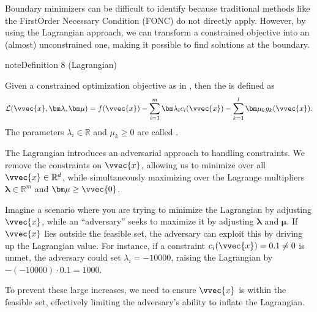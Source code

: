 \documentclass[letterpaper,10pt,english]{jupyterBook}
\begin{document}
\sphinxAtStartPar
Boundary minimizers can be difficult to identify because traditional methods like the First\sphinxhyphen{}Order Necessary Condition (FONC) do not directly apply. However, by using the Lagrangian approach, we can transform a constrained objective into an (almost) unconstrained one, making it possible to find solutions at the boundary.
\label{optimization_problems:lagrangian}
\begin{sphinxadmonition}{note}{Definition 8 (Lagrangian)}



\sphinxAtStartPar
Given a constrained optimization objective as in {\hyperref[\detokenize{optimization_problems:constr_objective}]{}}, then  the  is defined as
\begin{equation*}
\begin{split}\mathcal{L}(\vvec{x},\bm\lambda,\bm\mu) = f(\vvec{x}) - \sum_{i=1}^m\bm\lambda_i c_i(\vvec{x}) - \sum_{k=1}^l\bm\mu_k g_k(\vvec{x}).\end{split}
\end{equation*}
The parameters \(\lambda_i\in\mathbb{R}\) and \(\mu_k\geq 0\) are called .
\end{sphinxadmonition}

\sphinxAtStartPar
The Lagrangian introduces an adversarial approach to handling constraints. We remove the constraints on \(\vvec{x}\), allowing us to minimize over all \(\vvec{x}\in\mathbb{R}^d\), while simultaneously maximizing over the Lagrange multipliers \(\bm\lambda\in\mathbb{R}^m\) and \(\bm\mu\geq\vvec{0}\).

\sphinxAtStartPar
Imagine a scenario where you are trying to minimize the Lagrangian by adjusting \(\vvec{x}\), while an “adversary” seeks to maximize it by adjusting \(\bm\lambda\) and \(\bm\mu\). If \(\vvec{x}\) lies outside the feasible set, the adversary can exploit this by driving up the Lagrangian value. For instance, if a constraint \(c_i(\vvec{x})=0.1\neq 0\) is unmet, the adversary could set \(\lambda_i=-10000\), raising the Lagrangian by \(-(-10000)\cdot 0.1=1000\).

\sphinxAtStartPar
To prevent these large increases, we need to ensure \(\vvec{x}\) is within the feasible set, effectively limiting the adversary’s ability to inflate the Lagrangian.
\end{document}

